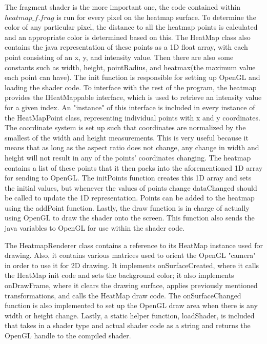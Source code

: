 The fragment shader is the more important one, the code contained within $heatmap\_f.frag$ is run for every pixel on the heatmap surface. To determine the color of any particular pixel, the distance to all the heatmap points is calculated and an appropriate color is determined based on this.
The HeatMap class also contains the java representation of these points as a 1D float array, with each point consisting of an x, y, and intensity value.
Then there are also some constants such as width, height, pointRadius, and heatmax(the maximum value each point can have). The init function is responsible for setting up OpenGL and loading the shader code. To interface with the rest of the program, the heatmap provides the IHeatMappable interface, which is used to retrieve an intensity value for a given index. An "instance" of this interface is included in every instance of the HeatMapPoint class, representing individual points with x and y coordinates. The coordinate system is set up such that coordinates are normalized by the smallest of the width and height measurements. This is very useful because it means that as long as the aspect ratio does not change, any change in width and height will not result in any of the points' coordinates changing. The heatmap contains a list of these points that it then packs into the aforementioned 1D array for sending to OpenGL. The initPoints function creates this 1D array and sets the initial values, but whenever the values of points change dataChanged should be called to update the 1D representation. Points can be added to the heatmap using the addPoint function.
Lastly, the draw function is in charge of actually using OpenGL to draw the shader onto the screen. This function also sends the java variables to OpenGL for use within the shader code.


The HeatmapRenderer class contains a reference to its HeatMap instance used for drawing. Also, it contains various matrices used to orient the OpenGL "camera" in order to use it for 2D drawing. It implements onSurfaceCreated, where it calls the HeatMap init code and sets the background color; it also implements onDrawFrame, where it clears the drawing surface, applies previously mentioned transformations, and calls the HeatMap draw code. The onSurfaceChanged function is also implemented to set up the OpenGL draw area when there is any width or height change. Lastly, a static helper function, loadShader, is included that takes in a shader type and actual shader code as a string and returns the OpenGL handle to the compiled shader.

